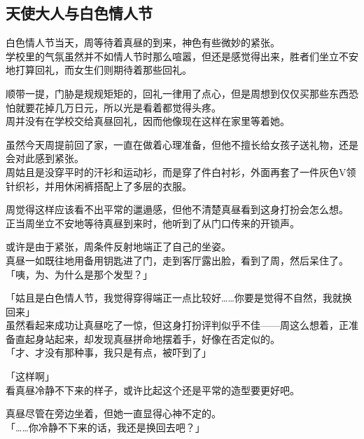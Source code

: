 \subsection{天使大人与白色情人节}

白色情人节当天，周等待着真昼的到来，神色有些微妙的紧张。\\

学校里的气氛虽然并不如情人节时那么喧嚣，但还是感觉得出来，胜者们坐立不安地打算回礼，而女生们则期待着那些回礼。

顺带一提，门胁是规规矩矩的，回礼一律用了点心，但是周想到仅仅买那些东西恐怕就要花掉几万日元，所以光是看着都觉得头疼。\\

周并没有在学校交给真昼回礼，因而他像现在这样在家里等着她。

虽然今天周提前回了家，一直在做着心理准备，但他不擅长给女孩子送礼物，还是会对此感到紧张。\\

周姑且是没穿平时的汗衫和运动衫，而是穿了件白衬衫，外面再套了一件灰色V领针织衫，并用休闲裤搭配上了多层的衣服。

周觉得这样应该看不出平常的邋遢感，但他不清楚真昼看到这身打扮会怎么想。\\

正当周坐立不安地等待真昼到来时，他听到了从门口传来的开锁声。

或许是由于紧张，周条件反射地端正了自己的坐姿。\\

真昼一如既往地用备用钥匙进了门，走到客厅露出脸，看到了周，然后呆住了。\\

「咦，为、为什么是那个发型？」

「姑且是白色情人节，我觉得穿得端正一点比较好……你要是觉得不自然，我就换回来」\\

虽然看起来成功让真昼吃了一惊，但这身打扮评判似乎不佳——周这么想着，正准备直起身站起来，却发现真昼拼命地摆着手，好像在否定似的。\\

「才、才没有那种事，我只是有点，被吓到了」

「这样啊」\\

看真昼冷静不下来的样子，或许比起这个还是平常的造型要更好吧。

真昼尽管在旁边坐着，但她一直显得心神不定的。\\

「……你冷静不下来的话，我还是换回去吧？」

